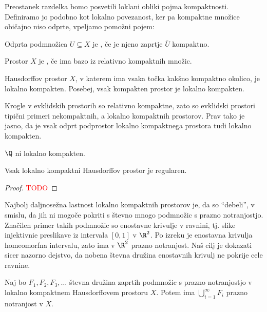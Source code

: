 Preostanek razdelka bomo posvetili loklani obliki pojma kompaktnosti. Definiramo jo podobno kot lokalno povezanost, ker pa kompaktne množice običajno niso odprte, vpeljamo pomožni pojem:
\begin{definicija}
    Odprta podmnožica $U \subseteq X$ je , če je njeno zaprtje \(\overline{U}\) kompaktno.
\end{definicija}

\begin{definicija}
    Prostor $X$ je , če ima bazo iz relativno kompaktnih množic.
\end{definicija}

\begin{izrek}
    Hausdorffov prostor $X$, v katerem ima vsaka točka kakšno kompaktno okolico, je lokalno kompakten. Posebej, vsak kompakten prostor je lokalno kompakten.
\end{izrek}

Krogle v evklidskih prostorih so relativno kompaktne, zato so evklidski prostori  tipični primeri nekompaktnih, a lokalno kompaktnih prostorov. Prav tako je jasno, da je vsak odprt podprostor lokalno kompaktnega prostora tudi lokalno kompakten.

\begin{primer}
    \(\Q\) ni lokalno kompakten.
\end{primer}

\begin{izrek}
    Vsak lokalno kompaktni Hausdorffov prostor je regularen.
\end{izrek}

\begin{proof}
    \textcolor{red}{TODO}
\end{proof}

Najbolj daljnosežna lastnost lokalno kompaktnih prostorov je, da so "`debeli"', v smislu, da jih ni mogoče pokriti s števno mnogo podmnožic s prazno notranjostjo. Značilen primer takih podmnožic so enostavne krivulje v ravnini, tj. slike injektivnie preslikave iz intervala $[0,1]$ v $\R^2$. Po izreku je enostavna krivulja homeomorfna intervalu, zato ima v \(\R^2\) prazno notranjost. Naš cilj je dokazati sicer nazorno dejstvo, da nobena števna družina enostavnih krivulj ne pokrije cele ravnine.

\begin{izrek}
    Naj bo $F_1, F_2, F_3, \ldots$ števna družina zaprtih podmnožic s prazno notranjostjo v lokalno kompaktnem Hausdorffovem prostoru \(X\). Potem ima $\bigcup_{i=1}^\infty F_i$ prazno notranjost v $X$. 
\end{izrek}

